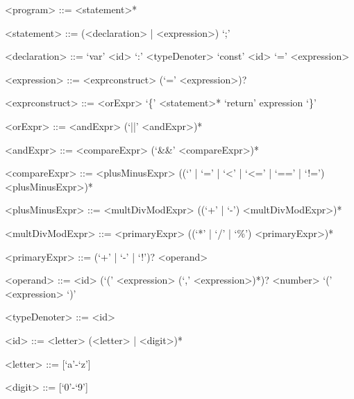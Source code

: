 \begin{grammar}

<program>			::= <statement>*

<statement>			::= (<declaration> | <expression>) `;'

<declaration>		::= `var' <id> `:' <typeDenoter>
\alt					`const' <id> `=' <expression>

<expression>		::= <exprconstruct> (`=' <expression>)?

<exprconstruct>		::= <orExpr>
\alt					`\{' <statement>* `return' expression `\}'

<orExpr>			::=	<andExpr> (`||' <andExpr>)*

<andExpr>			::= <compareExpr> (`&&' <compareExpr>)*

<compareExpr>		::= <plusMinusExpr> ((`\>' | `\>=' | `<' | `<=' | `==' | `!=') <plusMinusExpr>)*

<plusMinusExpr>		::= <multDivModExpr> ((`+' | `-') <multDivModExpr>)*

<multDivModExpr>	::= <primaryExpr> ((`*' | `/' | `\%') <primaryExpr>)*

<primaryExpr>		::= (`+' | `-' | `!')? <operand>

<operand>			::= <id> (`(' <expression> (`,' <expression>)*)?
\alt					<number>
\alt					`(' <expression> `)'

<typeDenoter>		::= <id>

<id>				::= <letter> (<letter> | <digit>)*

<letter>			::= [`a'-`z'] 
\alt					[`A'-`Z']

<digit>				::= [`0'-`9']

\end{grammar}